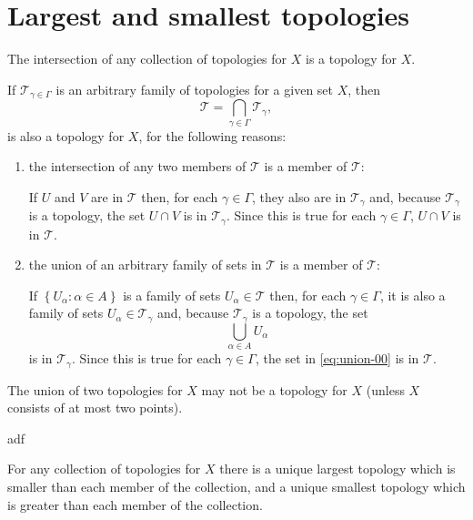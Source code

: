 \section{Largest and smallest topologies}

\begin{problem}
  The intersection of any collection of topologies for \(X\) is a topology for
  \(X\).
\end{problem}

\begin{solution}
  If \(\mathcal{T}_{\gamma\in\Gamma}\) is an arbitrary family of topologies for
  a given set \(X\), then 
  \[
    \mathcal{T}=\bigcap_{\gamma\in\Gamma}\mathcal{T}_{\gamma},
  \]
  is also a topology for \(X\), for the following reasons:
  \begin{enumerate}
    \item
      the intersection of any two members of \(\mathcal{T}\) is a member of
      \(\mathcal{T}\):

      If \(U\) and \(V\) are in \(\mathcal{T}\) then, for each
      \(\gamma\in\Gamma\), they also are in \(\mathcal{T}_{\gamma}\) and,
      because \(\mathcal{T}_{\gamma}\) is a topology, the set \(U\cap{V}\) is
      in \(\mathcal{T}_{\gamma}\). Since this is true for each
      \(\gamma\in\Gamma\), \(U\cap{V}\) is in \(\mathcal{T}\).

    \item
      the union of an arbitrary family of sets in \(\mathcal{T}\) is a member
      of \(\mathcal{T}\):

      If \(\left\{U_{\alpha}:\alpha\in{A}\right\}\) is a family of sets
      \(U_{\alpha}\in\mathcal{T}\) then, for each \(\gamma\in\Gamma\), it is
      also a family of sets \(U_{\alpha}\in\mathcal{T}_{\gamma}\) and, because
      \(\mathcal{T}_{\gamma}\) is a topology, the set
      \begin{equation}
        \bigcup_{\alpha\in{A}}U_{\alpha}
        \label{eq:union-00}
      \end{equation}
      is in \(\mathcal{T}_{\gamma}\). Since this is true for each
      \(\gamma\in\Gamma\), the set in \eqref{eq:union-00} is in
      \(\mathcal{T}\).

  \end{enumerate}
\end{solution}

\begin{problem}
  The union of two topologies for \(X\) may not be a topology for \(X\) (unless
  \(X\) consists of at most two points).
\end{problem}

\begin{solution}
  adf
\end{solution}

\begin{problem}
  For any collection of topologies for \(X\) there is a unique largest topology
  which is smaller than each member of the collection, and a unique smallest
  topology which is greater than each member of the collection.
\end{problem}

